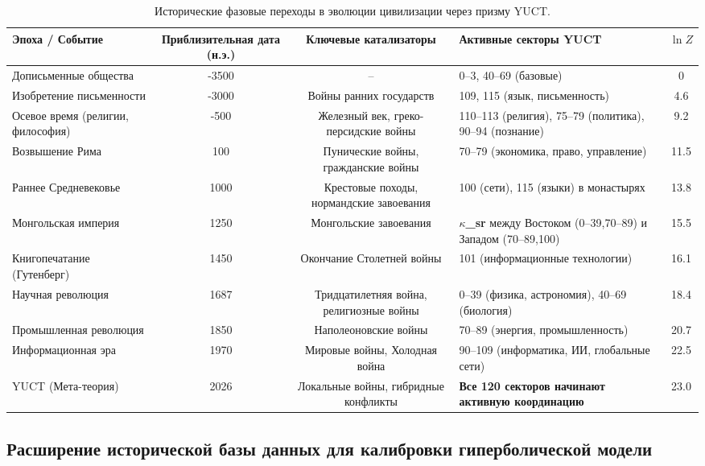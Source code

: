 \documentclass[12pt,a4paper]{article}
\theoremstyle{remark}
\begin{document}
	\begin{table}[htbp]
		\centering
		\caption{Исторические фазовые переходы в эволюции цивилизации через призму YUCT.}
		\label{tab:historical-transitions}
		\scriptsize  
		\begin{tabular}{p{2.2cm} c c p{5.5cm} c}
			\toprule
			\textbf{Эпоха / Событие} & \textbf{Приблизительная дата (н.э.)} & \textbf{Ключевые катализаторы} & \textbf{Активные секторы YUCT} & $\ln Z$ \\
			\midrule
			Дописьменные общества & -3500 & – & 0–3, 40–69 (базовые) & 0 \\
			Изобретение письменности & -3000 & Войны ранних государств & 109, 115 (язык, письменность) & 4.6 \\
			Осевое время (религии, философия) & -500 & Железный век, греко-персидские войны & 110–113 (религия), 75–79 (политика), 90–94 (познание) & 9.2 \\
			Возвышение Рима & 100 & Пунические войны, гражданские войны & 70–79 (экономика, право, управление) & 11.5 \\
			Раннее Средневековье & 1000 & Крестовые походы, нормандские завоевания & 100 (сети), 115 (языки) в монастырях & 13.8 \\
			Монгольская империя & 1250 & Монгольские завоевания & \textbf{$\kappa$\_sr} между Востоком (0–39,70–89) и Западом (70–89,100) & 15.5 \\
			Книгопечатание (Гутенберг) & 1450 & Окончание Столетней войны & 101 (информационные технологии) & 16.1 \\
			Научная революция & 1687 & Тридцатилетняя война, религиозные войны & 0–39 (физика, астрономия), 40–69 (биология) & 18.4 \\
			Промышленная революция & 1850 & Наполеоновские войны & 70–89 (энергия, промышленность) & 20.7 \\
			Информационная эра & 1970 & Мировые войны, Холодная война & 90–109 (информатика, ИИ, глобальные сети) & 22.5 \\
			YUCT (Мета-теория) & 2026 & Локальные войны, гибридные конфликты & \textbf{Все 120 секторов начинают активную координацию} & 23.0 \\
			\bottomrule
		\end{tabular}
	\end{table}
	
	\subsection{Расширение исторической базы данных для калибровки гиперболической модели}
	\label{subsec:historical-data}
	
\end{document}
